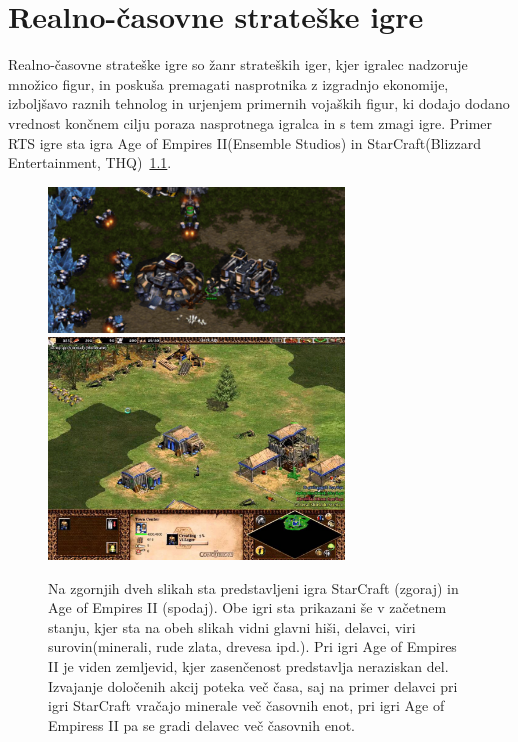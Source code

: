 \documentclass[a4paper, 12pt]{book}
\begin{document}
\chapter{Realno-časovne strateške igre}
\label{chrts}

Realno-časovne strateške igre so žanr strateških iger, kjer igralec nadzoruje množico figur, in poskuša premagati nasprotnika z izgradnjo ekonomije, izboljšavo raznih tehnolog in urjenjem primernih vojaških figur, ki dodajo dodano vrednost končnem cilju poraza nasprotnega igralca in s tem zmagi igre. 
Primer RTS igre sta igra Age of Empires II(Ensemble Studios) in StarCraft(Blizzard Entertainment, THQ)~\ref{picRtsGames}. 

\begin{figure}[h]
	\begin{center}
		\includegraphics[width=0.7\textwidth]{photos/rts_sc1.pdf}
		\includegraphics[width=0.7\textwidth]{photos/rts_aoe2.pdf}
	\end{center}
	\caption{Na zgornjih dveh slikah sta predstavljeni igra StarCraft (zgoraj) in Age of Empires II (spodaj). Obe igri sta prikazani še v začetnem stanju, kjer sta na obeh slikah vidni glavni hiši, delavci, viri surovin(minerali, rude zlata, drevesa ipd.). Pri igri Age of Empires II je viden zemljevid, kjer zasenčenost predstavlja neraziskan del. Izvajanje določenih akcij poteka več časa, saj na primer delavci pri igri StarCraft vračajo minerale več časovnih enot, pri igri Age of Empiress II pa se gradi delavec več časovnih enot.}
	\label{picRtsGames}
\end{figure}
\end{document}
